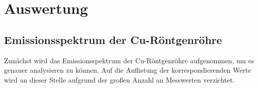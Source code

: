 \section{Auswertung}
\label{sec:Auswertung}

\subsection{Emissionsspektrum der Cu-Röntgenröhre}

Zunächst wird das Emissionsspektrum der Cu-Röntgenröhre 
aufgenommen, um es genauer analysieren zu können. 
Auf die Auflistung der korrespondierenden Werte wird 
an dieser Stelle aufgrund der großen Anzahl
an Messwerten verzichtet.\\


